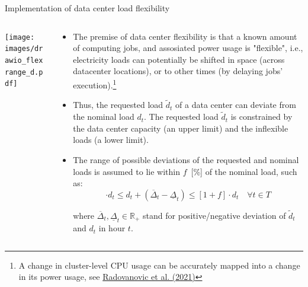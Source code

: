 \begin{frame}{Implementation of data center load flexibility}

{\footnotesize
  \begin{columns}[T]

  \begin{column}{6cm}
  \centering
  \vspace{0.2cm}
  \texttt{[image: images/drawio\_flexrange\_d.pdf]}
  \end{column}

  \begin{column}{9cm}
  \begin{itemize}

  \item The premise of data center flexibility is that a known amount of computing jobs, and assosiated power usage is "flexible", i.e., electricity loads can potentially be shifted in space (across datacenter locations), or to other times (by delaying jobs' execution).\footnote{{\scriptsize A change in cluster-level CPU usage can be accurately mapped into a change in its power usage, see \href{https://arxiv.org/abs/2106.11750}{Radovanovic et al. (2021)}}}

  \item Thus, the \alert{requested load $\widetilde{d}_t$} of a data center can deviate from the nominal load $d_t$. The requested load $\widetilde{d}_t$ is constrained by the data center capacity (an upper limit) and the inflexible loads (a lower limit).
  
  \item The range of possible deviations of the requested and nominal loads is assumed to lie within $f$~[\%] of the nominal load, such as:\\
  \begin{equation*}
  [1-f] \cdot d_t \le  d_t + (\overline{\Delta}_t - \underline{\Delta}_t) \le [1+f] \cdot d_t \quad \forall t \in T
  \label{eqn:range}
  \end{equation*}
  
  \vspace{0.1cm}
  \noindent where $\overline{\Delta}_t, \underline{\Delta}_t \in \mathbb{R}_{+}$ stand for positive/negative deviation of $\widetilde{d}_t$ and $d_t$ in hour $t$.
  \end{itemize}

  \end{column}
  \end{columns}
}
\end{frame}


